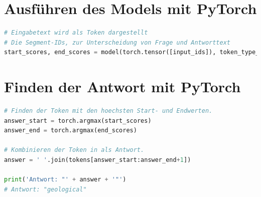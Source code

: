 \documentclass[
        ngerman,
        paper=a4,
        numbers=noendperiod,
]{scrreprt}
\begin{document}
\section{Ausführen des Models mit PyTorch}
\label{section:ANSW} %
\begin{lstlisting}[language=Python]
# Eingabetext wird als Token dargestellt
# Die Segment-IDs, zur Unterscheidung von Frage und Antworttext 
start_scores, end_scores = model(torch.tensor([input_ids]), token_type_ids=torch.tensor([segment_ids])) \end{lstlisting}



\section{Finden der Antwort mit PyTorch}
\label{section:END} %
\begin{lstlisting}[language=Python]
# Finden der Token mit den hoechsten Start- und Endwerten.
answer_start = torch.argmax(start_scores)
answer_end = torch.argmax(end_scores)

# Kombinieren der Token in als Antwort.
answer = ' '.join(tokens[answer_start:answer_end+1])

print('Antwort: "' + answer + '"') 
# Antwort: "geological"
\end{lstlisting}









\clearpage
        
        
        
\end{document}
